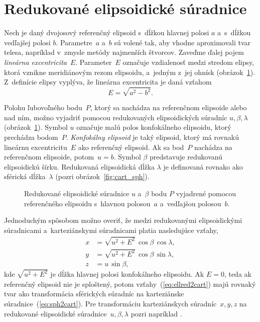 \documentclass[a4paper, 12pt]{book}
\begin{document}
\section{Redukované elipsoidické súradnice}
\label{sec:reduced_ell_coords}

Nech je daný dvojosový referenčný elipsoid s~dĺžkou hlavnej polosi $a$ 
a~s~dĺžkou vedľajšej polosi $b$.  Parametre~$a$ a~$b$ sú volené tak, aby vhodne 
aproximovali tvar telesa, napríklad v~zmysle metódy najmenších štvorcov.  
Zaveďme ďalej pojem \emph{lineárna excentricita}~$E$.  Parameter~$E$ označuje 
vzdialenosť medzi stredom elipsy, ktorá vznikne meridiánovým rezom elipsoidu, 
a~jedným z~jej ohnísk (obrázok~\ref{fig:reduced_ell_coords}).  Z~definície 
elipsy vyplýva, že lineárna excentricita je daná vzťahom
%
\begin{equation}
\label{eq:linear_eccentricity}
E = \sqrt{a^2 - b^2}{.}
\end{equation}

Polohu ľubovoľného bodu~$P$, ktorý sa nachádza na referenčnom elipsoide alebo 
nad ním, možno vyjadriť pomocou redukovaných elipsoidických súradníc $u, \beta, 
\lambda$ (obrázok~\ref{fig:reduced_ell_coords}).  Symbol $u$ označuje malú 
polos konfokálneho elipsoidu, ktorý prechádza bodom~$P$.  \emph{Konfokálny 
elipsoid} je taký elipsoid, ktorý má rovnakú lineárnu excentricitu~$E$ ako 
referenčný elipsoid.  Ak sa bod~$P$ nachádza na referenčnom elipsoide, potom~$u 
= b$.  Symbol $\beta$ predstavuje redukovanú elipsoidickú šírku.  Redukovaná 
elipsoidická dĺžka $\lambda$ je definovaná rovnako ako sférická dĺžka~$\lambda$ 
(pozri obrázok~\ref{fig:cart_sph}).

\begin{figure}
\centering

\caption{Redukované elipsoidické súradnice $u$ a~$\beta$ bodu $P$ vyjadrené 
pomocou referenčného elipsoidu s~hlavnou polosou~$a$ a~vedľajšou polosou~$b$.}
\label{fig:reduced_ell_coords}
\end{figure}

Jednoduchým spôsobom možno overiť, že medzi redukovanými elipsoidickými 
súradnicami a~karteziánskymi súradnicami platia nasledujúce vzťahy,
%
\begin{equation}
\label{eq:ellred2cart}
\begin{split}
x &= \sqrt{u^2 + E^2} \, \cos\beta \, \cos\lambda{,}\\
y &= \sqrt{u^2 + E^2} \, \cos\beta \, \sin\lambda{,}\\
z &= u \, \sin\beta{,}
\end{split}
\end{equation}
%
kde $\sqrt{u^2 + E^2}$ je dĺžka hlavnej polosi konfokálneho elipsoidu.  Ak $E 
= 0$, teda ak referenčný elipsoid nie je sploštený, potom 
vzťahy~(\ref{eq:ellred2cart}) majú rovnaký tvar ako transformácia sférických 
súradníc na karteziánske súradnice~(\ref{eq:sph2cart}).  Pre transformáciu 
karteziánskych súradníc~$x, y, z$ na redukované elipsoidické súradnice~$u, 
\beta, \lambda$ pozri napríklad \textcite{MoritzPhysicalGeodesy}.
\end{document}
